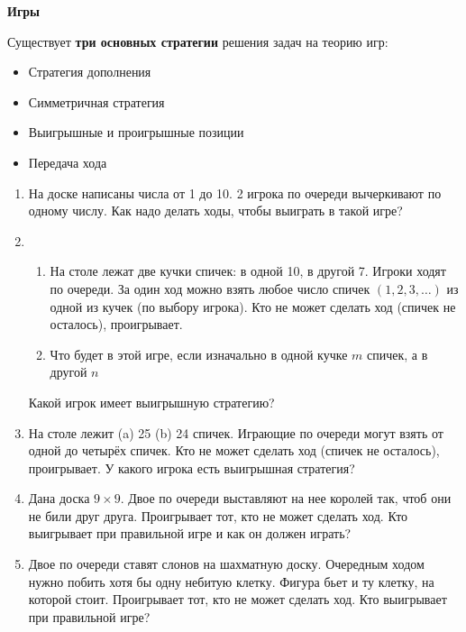 \documentclass{article}
\begin{document}
\large
	

\begin{center}
\textbf{Игры}
\end{center}

Существует \textbf{три основных стратегии} решения задач на теорию игр:
\begin{itemize}
	\item Стратегия дополнения
	
	\item Симметричная стратегия
	
	\item Выигрышные и проигрышные позиции
	
	\item Передача хода
\end{itemize}

\begin{enumerate}[label*=\protect\fbox{\arabic{enumi}}]

\item На доске написаны числа от 1 до 10. 2 игрока по очереди вычеркивают по одному числу. Как надо делать ходы, чтобы выиграть в такой игре?
	
\item \begin{enumerate}
	\item На столе лежат две кучки спичек: в одной 10, в другой 7. Игроки ходят по очереди. За один ход можно взять любое число спичек $(1, 2, 3, \dots)$ из одной из кучек (по выбору игрока). Кто не может сделать ход (спичек не осталось), проигрывает. 
	\item Что будет в этой игре, если изначально в одной кучке $m$ спичек, а в другой $n$	
\end{enumerate}

Какой игрок имеет выигрышную стратегию?

\item На столе лежит (a) 25 (b) 24 спичек. Играющие по очереди могут взять от одной до четырёх спичек. Кто не может сделать ход (спичек не осталось), проигрывает. У какого игрока есть выигрышная стратегия?

\item Дана доска $9 \times 9$. Двое по очереди выставляют на нее королей так, чтоб они не били друг друга. Проигрывает тот, кто не может сделать ход. Кто выигрывает при правильной игре и как он должен играть?

\item Двое по очереди ставят слонов на шахматную доску. Очередным ходом нужно побить хотя бы одну небитую клетку. Фигура бьет и ту клетку, на которой стоит. Проигрывает тот, кто не может сделать ход. Кто выигрывает при правильной игре?


\end{enumerate}
\end{document}
